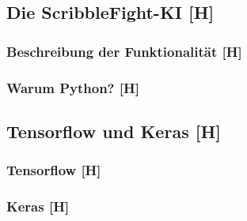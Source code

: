 \subsection{Die ScribbleFight-KI [H]}
\subsubsection{Beschreibung der Funktionalität [H]}
\subsubsection{Warum Python? [H]}
\subsection{Tensorflow und Keras [H]}
\subsubsection{Tensorflow [H]}
\subsubsection{Keras [H]}











